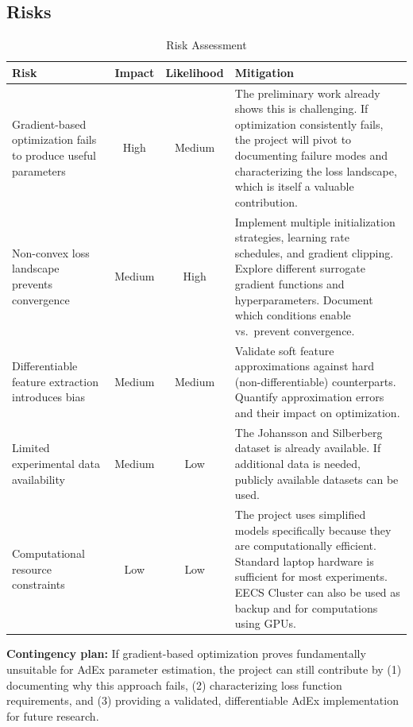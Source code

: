 \documentclass{article}
\begin{document}
\subsection{Risks}

\begin{table}[ht]
\centering
\small
\begin{tabular}{p{3.5cm}ccp{5.5cm}}
\toprule
\textbf{Risk} & \textbf{Impact} & \textbf{Likelihood} & \textbf{Mitigation} \\
\midrule
Gradient-based optimization fails to produce useful parameters & High & Medium & The preliminary work already shows this is challenging. If optimization consistently fails, the project will pivot to documenting failure modes and characterizing the loss landscape, which is itself a valuable contribution. \\
\midrule
Non-convex loss landscape prevents convergence & Medium & High & Implement multiple initialization strategies, learning rate schedules, and gradient clipping. Explore different surrogate gradient functions and hyperparameters. Document which conditions enable vs.\ prevent convergence. \\
\midrule
Differentiable feature extraction introduces bias & Medium & Medium & Validate soft feature approximations against hard (non-differentiable) counterparts. Quantify approximation errors and their impact on optimization. \\
\midrule
Limited experimental data availability & Medium & Low & The Johansson and Silberberg dataset \cite{Johansson2020} is already available. If additional data is needed, publicly available datasets can be used. \\
\midrule
Computational resource constraints & Low & Low & The project uses simplified models specifically because they are computationally efficient. Standard laptop hardware is sufficient for most experiments. EECS Cluster can also be used as backup and for computations using GPUs.\\
\bottomrule
\end{tabular}
\caption{Risk Assessment}
\label{tab:risks}
\end{table}

\textbf{Contingency plan:} If gradient-based optimization proves fundamentally unsuitable for AdEx parameter estimation, the project can still contribute by (1) documenting why this approach fails, (2) characterizing loss function requirements, and (3) providing a validated, differentiable AdEx implementation for future research.
\end{document}
